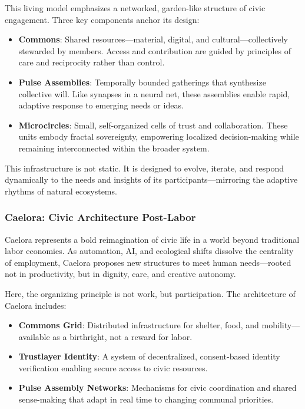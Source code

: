 \documentclass{article}
\theoremstyle{plain}
\theoremstyle{claimstyle}
\begin{document}
This living model emphasizes a networked, garden-like structure of civic engagement. Three key components anchor its design:

\begin{itemize}
    \item \textbf{Commons}: Shared resources—material, digital, and cultural—collectively stewarded by members. Access and contribution are guided by principles of care and reciprocity rather than control.
    \item \textbf{Pulse Assemblies}: Temporally bounded gatherings that synthesize collective will. Like synapses in a neural net, these assemblies enable rapid, adaptive response to emerging needs or ideas.
    \item \textbf{Microcircles}: Small, self-organized cells of trust and collaboration. These units embody fractal sovereignty, empowering localized decision-making while remaining interconnected within the broader system.
\end{itemize}

This infrastructure is not static. It is designed to evolve, iterate, and respond dynamically to the needs and insights of its participants—mirroring the adaptive rhythms of natural ecosystems.

\subsubsection{Caelora: Civic Architecture Post-Labor}

Caelora represents a bold reimagination of civic life in a world beyond traditional labor economies. As automation, AI, and ecological shifts dissolve the centrality of employment, Caelora proposes new structures to meet human needs—rooted not in productivity, but in dignity, care, and creative autonomy.

Here, the organizing principle is not work, but participation. The architecture of Caelora includes:

\begin{itemize}
    \item \textbf{Commons Grid}: Distributed infrastructure for shelter, food, and mobility—available as a birthright, not a reward for labor.
    \item \textbf{Trustlayer Identity}: A system of decentralized, consent-based identity verification enabling secure access to civic resources.
    \item \textbf{Pulse Assembly Networks}: Mechanisms for civic coordination and shared sense-making that adapt in real time to changing communal priorities.
\end{itemize}
\end{document}
